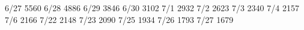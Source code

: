 6/27	5560
6/28	4886
6/29	3846
6/30	3102
7/1	2932
7/2	2623
7/3	2340
7/4  2157
7/6  2166
7/22 2148
7/23 2090
7/25 1934
7/26 1793
7/27 1679